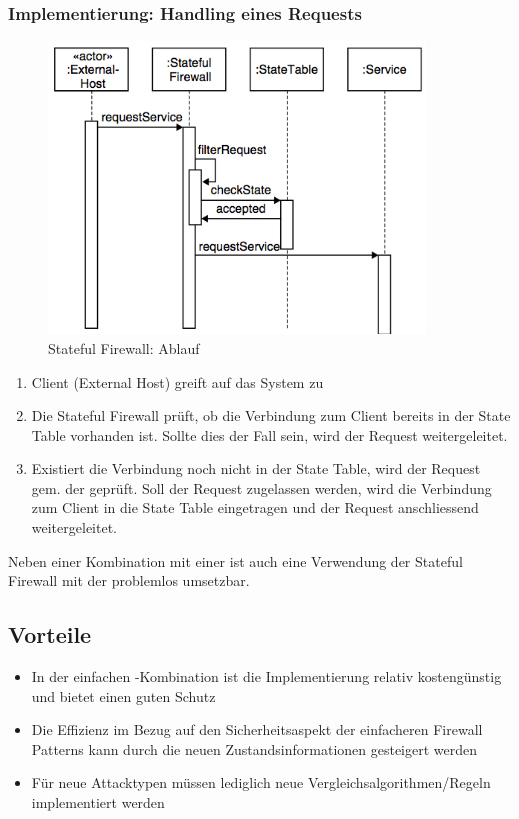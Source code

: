 \subsubsection*{Implementierung: Handling eines Requests}
\begin{figure}[H]
	\centering
	\includegraphics[width=10cm]{content/security/firewall-architectures/images/stateful-sequence.png}
	\caption{Stateful Firewall: Ablauf \cite{SecPatterns06}}
\end{figure}

\begin{enumerate}
	\item Client (External Host) greift auf das System zu
	\item Die Stateful Firewall prüft, ob die Verbindung zum Client bereits in der State Table vorhanden ist. Sollte dies der Fall sein, wird der Request weitergeleitet.
	\item Existiert die Verbindung noch nicht in der State Table, wird der Request gem. der  geprüft. Soll der Request zugelassen werden, wird die Verbindung zum Client in die State Table eingetragen und der Request anschliessend weitergeleitet.
\end{enumerate}

Neben einer Kombination mit einer  ist auch eine Verwendung der Stateful Firewall mit der  problemlos umsetzbar.

\subsection*{Vorteile}
\begin{itemize}
	\item In der einfachen -Kombination ist die Implementierung relativ kostengünstig und bietet einen guten Schutz
	\item Die Effizienz im Bezug auf den Sicherheitsaspekt der einfacheren Firewall Patterns kann durch die neuen Zustandsinformationen gesteigert werden
	\item Für neue Attacktypen müssen lediglich neue Vergleichsalgorithmen/Regeln implementiert werden
\end{itemize}


